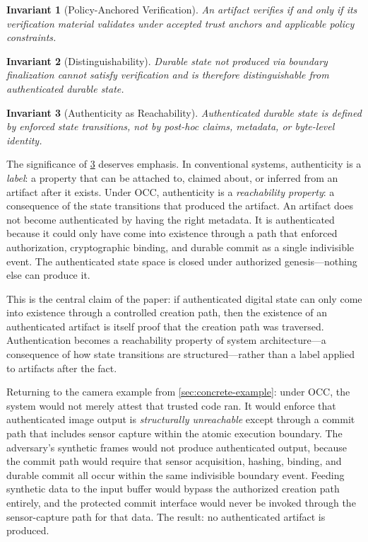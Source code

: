 \documentclass[11pt,letterpaper]{article}
\theoremstyle{occplain}
\theoremstyle{occremark}
\newtheorem{invariant}{Invariant}[section]
\begin{document}
\begin{invariant}[Policy-Anchored Verification]
\label{inv:policy}
An artifact verifies if and only if its verification material validates under accepted trust anchors and applicable policy constraints.
\end{invariant}

\begin{invariant}[Distinguishability]
\label{inv:distinguishability}
Durable state not produced via boundary finalization cannot satisfy verification and is therefore distinguishable from authenticated durable state.
\end{invariant}

\begin{invariant}[Authenticity as Reachability]
\label{inv:authenticity}
Authenticated durable state is defined by enforced state transitions, not by post-hoc claims, metadata, or byte-level identity.
\end{invariant}

The significance of \cref{inv:authenticity} deserves emphasis. In conventional systems, authenticity is a \emph{label}: a property that can be attached to, claimed about, or inferred from an artifact after it exists. Under OCC, authenticity is a \emph{reachability property}: a consequence of the state transitions that produced the artifact. An artifact does not become authenticated by having the right metadata. It is authenticated because it could only have come into existence through a path that enforced authorization, cryptographic binding, and durable commit as a single indivisible event. The authenticated state space is closed under authorized genesis---nothing else can produce it.

This is the central claim of the paper: if authenticated digital state can only come into existence through a controlled creation path, then the existence of an authenticated artifact is itself proof that the creation path was traversed. Authentication becomes a reachability property of system architecture---a consequence of how state transitions are structured---rather than a label applied to artifacts after the fact.

Returning to the camera example from \cref{sec:concrete-example}: under OCC, the system would not merely attest that trusted code ran. It would enforce that authenticated image output is \emph{structurally unreachable} except through a commit path that includes sensor capture within the atomic execution boundary. The adversary's synthetic frames would not produce authenticated output, because the commit path would require that sensor acquisition, hashing, binding, and durable commit all occur within the same indivisible boundary event. Feeding synthetic data to the input buffer would bypass the authorized creation path entirely, and the protected commit interface would never be invoked through the sensor-capture path for that data. The result: no authenticated artifact is produced.
\end{document}
